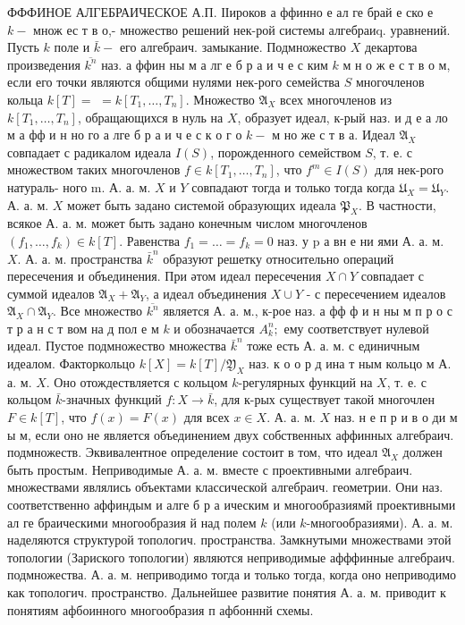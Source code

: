 \documentclass[10pt]{article}
\begin{document}
ФФФИНОЕ АЛГЕБРАИЧЕСКОЕ А.П. ІІироков а ффинно е ал ге брай е ско е $k-$ множ ес т в о,- множество решений нек-рой системы алгебраиq. уравнений. Пусть $k$ поле и $\bar{k}-$ его алгебраич. замыкание. Подмножество $X$ декартова произведения $\overline{k^{n}}$ наз. а ффин ны м а лг е б р а и ч е с ким $k$ м н о ж е с т в о м, если его точки являются общими нулями нек-рого семейства $S$ многочленов кольца $k[T]=$ $=k\left[T_{1}, \ldots, T_{n}\right]$. Множество $\mathfrak{A}_{X}$ всех многочленов из $k\left[T_{1}, \ldots, T_{n}\right]$, обращающихся в нуль на $X$, образует идеал, к-рый наз. и д е а ло м а фф и н но го а лге б р а и ч е с к о г о $k-$ м но же с т в а. Идеал $\mathfrak{A}_{X}$ совпадает с радикалом идеала $I(S)$, порожденного семейством $S$, т. е. с множеством таких многочленов $f \in k\left[T_{1}, \ldots, T_{n}\right]$, что $f^{m} \in I(S)$ для нек-рого натураль- ного $\mathrm{m}$. А. а. м. $X$ и $Y$ совпадают тогда и только тогда когда $\mathfrak{U}_{X}=\mathfrak{U}_{Y}$. А. а. м. $X$ может быть задано системой образующих идеала $\mathfrak{P}_{X}$. В частности, всякое А. а. м. может быть задано конечным числом многочленов $\left(f_{1}, \ldots, f_{k}\right) \in k[T]$. Равенства $f_{1}=\ldots=f_{k}=0$ наз. у p а вн е ни ями А. а. м. $X$. А. а. м. пространства $\bar{k}^{n}$ образуют решетку относительно операций пересечения и объединения. При әтом идеал пересечения $X \cap Y$ совпадает с суммой идеалов $\mathfrak{A}_{X}+\mathfrak{A}_{Y}$, а идеал объединения $X \cup Y$ - с пересечением идеалов $\mathfrak{A}_{X} \cap \mathfrak{A}_{Y}$. Все множество $\overline{k^{n}}$ является А. а. м., к-рое наз. а фф ф и н ны м п р о с т р а н с т вом на д пол е м $k$ и обозначается $A_{k}^{n} ;$ ему соответствует нулевой идеал. Пустое подмножество множества $\bar{k}^{n}$ тоже есть А. а. м. с единичным идеалом. Факторкольцо $k[X]=k[T] / \mathfrak{Y}_{X}$ наз. к о о р д ина т ным кольцо м А. а. м. $X$. Оно отождествляется с кольцом $k$-регулярных функций на $X$, т. е. с кольцом $\bar{k}$-значных функций $f: X \rightarrow \bar{k}$, для к-рых существует такой многочлен $F \in k[T]$, что $f(x)=F(x)$ для всех $x \in X$. А. а. м. $X$ наз. н е п р и в о ди м ы м, если оно не является объединением двух собственных аффинных алгебраич. подмножеств. Эквивалентное определение состоит в том, что идеал $\mathfrak{A}_{X}$ должен быть простым. Неприводимые А. а. м. вместе с проективными алгебраич. множествами являлись объектами классической алгебраич. геометрии. Они наз. соответственно аффиндым и алге б р а ическим и многообразиямй проективными ал ге браическими многообразия й над полем $k$ (или $k$-многообразиями). А. а. м. наделяются структурой топологич. пространства. Замкнутыми множествами этой топологии (Зариского топологии) являются неприводимые афффинные алгебраич. подмножества. А. а. м. неприводимо тогда и только тогда, когда оно неприводимо как топологич. пространство. Дальнейшее развитие понятия А. а. м. приводит к понятиям афбоинного многообразия п афбонннй схемы.
\end{document}
